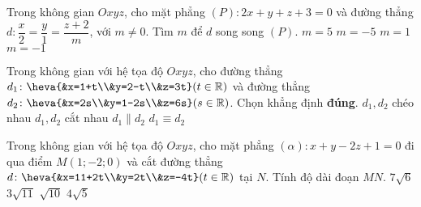 	\begin{ex}%
	Trong không gian $Oxyz$, cho mặt phẳng $(P) \colon 2x+y+z+3=0$ và đường thẳng $d: \dfrac{x}{2}=\dfrac{y}{1}=\dfrac{z+2}{m}$, với $m\neq 0$. Tìm $m$ để $d$ song song $(P)$.
	\choice
	{$m=5 $}
	{\True $m=-5 $}
	{$m=1 $}
	{$m=-1 $}
	\end{ex}
	\begin{ex}%
	Trong không gian với hệ tọa độ $Oxyz$, cho đường thẳng $d_1\colon \heva{&x=1+t\\&y=2-t\\&z=3t}(t\in \mathbb{R})$ và đường thẳng $d_2\colon \heva{&x=2s\\&y=1-2s\\&z=6s}(s\in \mathbb{R})$. Chọn khẳng định \textbf{đúng}.
	\choice
	{$d_1,d_2$ chéo nhau}
	{$d_1,d_2$ cắt nhau}
	{\True $d_1\parallel d_2$}
	{$d_1\equiv d_2$}
	\end{ex}
	\begin{ex}%
	Trong không gian với hệ tọa độ $Oxyz$, cho mặt phẳng $(\alpha)\colon x+y-2z+1=0$ đi qua điểm $M(1;-2;0)$ và cắt đường thẳng $d\colon \heva{&x=11+2t\\&y=2t\\&z=-4t} (t\in \mathbb{R})$ tại $N$. Tính độ dài đoạn $MN$.
	\choice
	{$7\sqrt{6}$}
	{$3\sqrt{11}$}
	{$\sqrt{10}$}
	{\True $4\sqrt{5}$}
	\end{ex}
